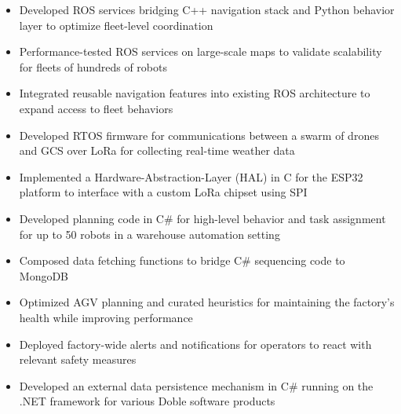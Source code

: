 \documentclass[10pt,a4paper,ragged2e,withhyper]{altacv}
\begin{document}
    \begin{itemize}
        \item Developed ROS services bridging C++ navigation stack and Python behavior layer to optimize fleet-level coordination
        \item Performance-tested ROS services on large-scale maps to validate scalability for fleets of hundreds of robots
        \item Integrated reusable navigation features into existing ROS architecture to expand access to fleet behaviors
    \end{itemize}
    \begin{itemize}
        \item Developed RTOS firmware for communications between a swarm of drones and GCS over LoRa for collecting real-time weather data
        \item Implemented a Hardware-Abstraction-Layer (HAL) in C for the ESP32 platform to interface with a custom LoRa chipset using SPI
    \end{itemize}
    \begin{itemize}
        \item Developed planning code in C\# for high-level behavior and task assignment for up to 50 robots in a warehouse automation setting
        \item Composed data fetching functions to bridge C\# sequencing code to MongoDB
        \item Optimized AGV planning and curated heuristics for maintaining the factory's health while improving performance
        \item Deployed factory-wide alerts and notifications for operators to react with relevant safety measures
    \end{itemize}
    \begin{itemize}
        \item Developed an external data persistence mechanism in C\# running on the .NET framework for various Doble software products
    \end{itemize}
\end{document}
